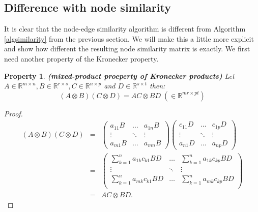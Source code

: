 \documentclass[a4paper,11pt]{report}
\newtheorem{property}[theorem]{Property}
\newcommand{\R}{{\mathbb R}}
\begin{document}
 \subsection{Difference with node similarity}
It is clear that the node-edge similarity algorithm is different from 
Algorithm \ref{algsimilarity} from the previous section. We will make this a little 
more explicit and show how different the resulting node similarity matrix is exactly. We first need another property of the Kronecker property.

\begin{property}\textbf{(mixed-product proeperty of Kronecker products)}
  Let $A \in \R^{m\times n}, B \in \R^{r \times s}, C \in \R^{n\times p}$ and $D \in \R^{s \times t}$ 
  then:
  $$(A\otimes B)(C \otimes D) = AC \otimes BD\; (\in \R^{mr \times pt})$$
\end{property}
\begin{proof}
  \begin{eqnarray*}
(A\otimes B)(C \otimes D) &=&
  \begin{pmatrix}
    a_{11}B & \ldots & a_{1n}B\\
    \vdots & \ddots & \vdots\\
    a_{m1}B & \ldots & a_{mn}B
  \end{pmatrix}
  \begin{pmatrix}
    c_{11}D & \ldots & c_{1p}D\\
    \vdots & \ddots & \vdots\\
    a_{n1}D & \ldots & a_{np}D
  \end{pmatrix}\\
  &=& \begin{pmatrix}
    \sum_{k=1}^n a_{1k}c_{k1}BD & \ldots & \sum_{k=1}^n a_{1k}c_{kp}BD\\
    \vdots & \ddots & \vdots\\
    \sum_{k=1}^n a_{mk}c_{k1}BD & \ldots & \sum_{k=1}^n a_{mk}c_{kp}BD\\
  \end{pmatrix}\\
  &=& AC \otimes BD.
  \end{eqnarray*}
\end{proof}
\end{document}
